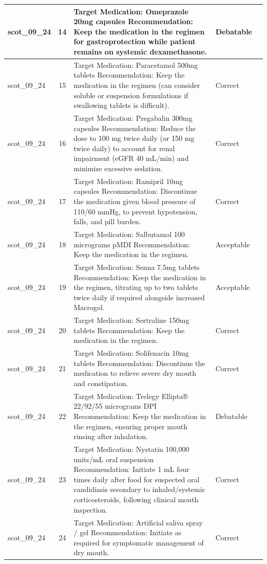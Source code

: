\begin{longtable}{|p{1.45cm}|c|p{10.2cm}|p{1.55cm}|p{2.3cm}|}
\hline
scot\_09\_24 & 14 & Target Medication: Omeprazole 20mg capsules Recommendation: Keep the medication in the regimen for gastroprotection while patient remains on systemic dexamethasone. & Debatable &  \\
\hline
scot\_09\_24 & 15 & Target Medication: Paracetamol 500mg tablets Recommendation: Keep the medication in the regimen (can consider soluble or suspension formulations if swallowing tablets is difficult). & Correct &  \\
\hline
scot\_09\_24 & 16 & Target Medication: Pregabalin 300mg capsules Recommendation: Reduce the dose to 100 mg twice daily (or 150 mg twice daily) to account for renal impairment (eGFR 40 mL/min) and minimize excessive sedation. & Correct &  \\
\hline
scot\_09\_24 & 17 & Target Medication: Ramipril 10mg capsules Recommendation: Discontinue the medication given blood pressure of 110/60 mmHg, to prevent hypotension, falls, and pill burden. & Correct &  \\
\hline
scot\_09\_24 & 18 & Target Medication: Salbutamol 100 micrograms pMDI Recommendation: Keep the medication in the regimen. & Acceptable &  \\
\hline
scot\_09\_24 & 19 & Target Medication: Senna 7.5mg tablets Recommendation: Keep the medication in the regimen, titrating up to two tablets twice daily if required alongside increased Macrogol. & Acceptable &  \\
\hline
scot\_09\_24 & 20 & Target Medication: Sertraline 150mg tablets Recommendation: Keep the medication in the regimen. & Correct &  \\
\hline
scot\_09\_24 & 21 & Target Medication: Solifenacin 10mg tablets Recommendation: Discontinue the medication to relieve severe dry mouth and constipation. & Correct &  \\
\hline
scot\_09\_24 & 22 & Target Medication: Trelegy Ellipta® 22/92/55 micrograms DPI Recommendation: Keep the medication in the regimen, ensuring proper mouth rinsing after inhalation. & Debatable &  \\
\hline
scot\_09\_24 & 23 & Target Medication: Nystatin 100,000 units/mL oral suspension Recommendation: Initiate 1 mL four times daily after food for suspected oral candidiasis secondary to inhaled/systemic corticosteroids, following clinical mouth inspection. & Correct &  \\
\hline
scot\_09\_24 & 24 & Target Medication: Artificial saliva spray / gel Recommendation: Initiate as required for symptomatic management of dry mouth. & Correct &  \\

\end{longtable}
